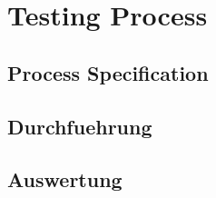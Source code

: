\chapter{Testing Process}\label{testingprocess}

\section{Process Specification}
\section{Durchfuehrung}
\section{Auswertung}
 
